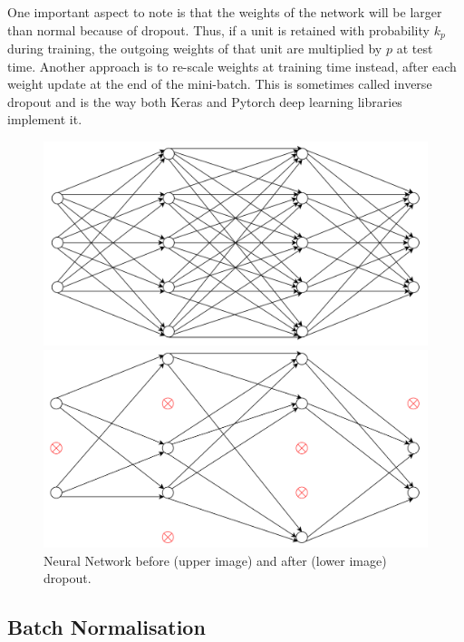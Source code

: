 One important aspect to note is that the weights of the network will be larger than normal because of dropout. Thus, if a unit is retained with probability $k_p$ during training, the outgoing weights of that unit are multiplied by $p$ at test
time. Another approach is to re-scale weights at training time instead, after each weight update at the end of the mini-batch. This is sometimes called inverse dropout and is the way both Keras and Pytorch deep learning libraries implement it. \\


\begin{figure}[H]
  \centering
  \includegraphics[scale=0.35]{Images/beforedrp.png}

  \bigskip

  \bigskip

  \includegraphics[scale=0.35]{Images/afterdrp.png}

  \bigskip

  \caption{Neural Network before (upper image) and after (lower image) dropout.}
  \label{dropout}
\end{figure}

\subsection{Batch Normalisation}


